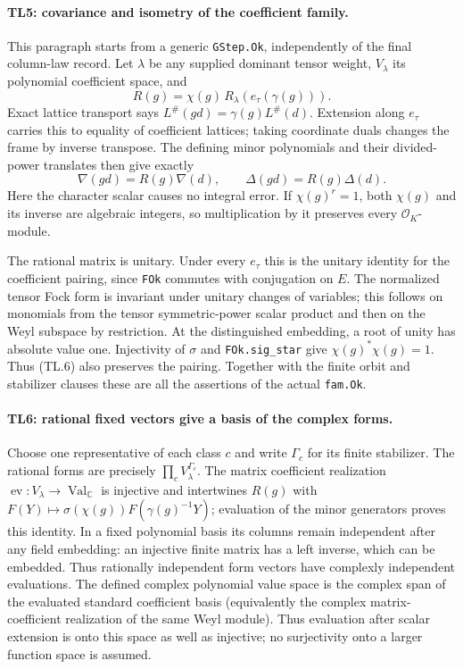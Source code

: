 \paragraph{TL5: covariance and isometry of the coefficient family.}
This paragraph starts from a generic \texttt{GStep.Ok}, independently
of the final column-law record. Let $\lambda$ be any supplied
dominant tensor weight, $V_\lambda$ its polynomial coefficient space,
and
\[
 R(g)=\chi(g)\,R_\lambda(e_\tau(\gamma(g))) .       \tag{TL.6}
\]
Exact lattice transport says
$L^\#(gd)=\gamma(g)L^\#(d)$. Extension along $e_\tau$ carries this
to equality of coefficient lattices; taking coordinate duals changes
the frame by inverse transpose. The defining minor polynomials and
their divided-power translates then give exactly
\[
 \nabla(gd)=R(g)\nabla(d),\qquad
 \Delta(gd)=R(g)\Delta(d).                         \tag{TL.7}
\]
Here the character scalar causes no integral error. If
$\chi(g)^r=1$, both $\chi(g)$ and its inverse are algebraic integers,
so multiplication by it preserves every $\mathcal O_K$-module.

The rational matrix is unitary. Under every $e_\tau$ this is the
unitary identity for the coefficient pairing, since \texttt{FOk}
commutes with conjugation on $E$. The normalized tensor Fock form
is invariant under unitary changes of variables; this follows on
monomials from the tensor symmetric-power scalar product and then
on the Weyl subspace by restriction. At the distinguished embedding,
a root of unity has absolute value one. Injectivity of $\sigma$
and \texttt{FOk.sig\_star} give
$\chi(g)^*\chi(g)=1$. Thus (TL.6) also preserves the pairing.
Together with the finite orbit and stabilizer clauses these are all
the assertions of the actual \texttt{fam.Ok}.

\paragraph{TL6: rational fixed vectors give a basis of the complex
forms.}
Choose one representative of each class $c$ and write $\Gamma_c$
for its finite stabilizer. The rational forms are precisely
$\prod_c V_\lambda^{\Gamma_c}$. The matrix coefficient realization
$\operatorname{ev}:V_\lambda\to\operatorname{Val}_{\mathbb C}$ is
injective and intertwines $R(g)$ with
$F(Y)\mapsto\sigma(\chi(g))F(\gamma(g)^{-1}Y)$; evaluation of the
minor generators proves this identity. In a fixed polynomial basis
its columns remain independent after any field embedding: an
injective finite matrix has a left inverse, which can be embedded.
Thus rationally independent form vectors have complexly independent
evaluations. The defined complex polynomial value space is the
complex span of the evaluated standard coefficient basis (equivalently
the complex matrix-coefficient realization of the same Weyl module).
Thus evaluation after scalar extension is onto this space as well
as injective; no surjectivity onto a larger function space is assumed.

